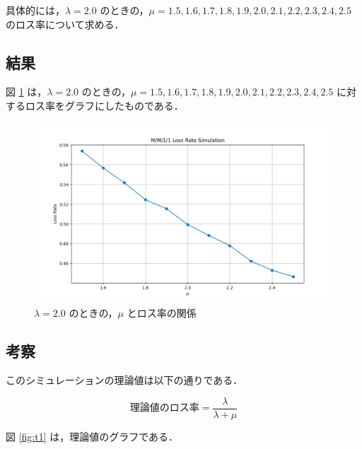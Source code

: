 \documentclass[fleqn, a4paper. 12pt]{jsarticle}
\begin{document}
      具体的には，$\lambda = 2.0$ のときの，$\mu=1.5,1.6,1.7,1.8,1.9,2.0,2.1,2.2,2.3,2.4,2.5$ のロス率について求める．

    \subsection*{結果}

      図 \ref{fig:8} は，$\lambda = 2.0$ のときの，$\mu=1.5,1.6,1.7,1.8,1.9,2.0,2.1,2.2,2.3,2.4,2.5$ に対するロス率をグラフにしたものである．

      \begin{figure}[!h]
        \centering
        \includegraphics[width=1\textwidth]{plot_3_2.png}
        \caption{$\lambda = 2.0$ のときの，$\mu$ とロス率の関係}
        \label{fig:8}
      \end{figure}

    \subsection*{考察}

      このシミュレーションの理論値は以下の通りである．

      \begin{equation}
        \text{理論値のロス率} = \frac{\lambda}{\lambda + \mu}
      \end{equation}

      \quad

      図 \ref{fig:t1} は，理論値のグラフである．
\end{document}
